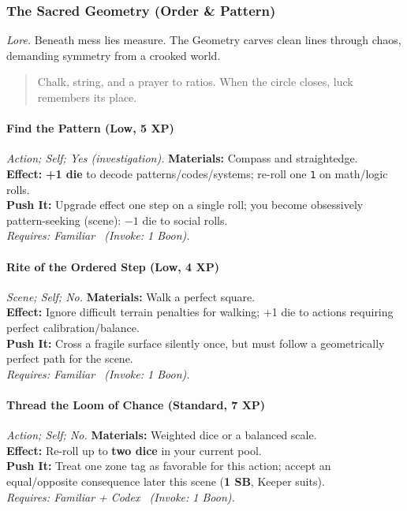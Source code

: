 \subsubsection{The Sacred Geometry (Order \& Pattern)}
\textit{Lore.} Beneath mess lies measure. The Geometry carves clean lines through chaos, demanding symmetry from a crooked world.

\begin{quote}
Chalk, string, and a prayer to ratios. When the circle closes, luck remembers its place.
\end{quote}

\paragraph{Find the Pattern (Low, 5 XP)} \emph{Action; Self; Yes (investigation).}
\textbf{Materials:} Compass and straightedge.\\
\textbf{Effect:} \textbf{+1 die} to decode patterns/codes/systems; re-roll one \texttt{1} on math/logic rolls.\\
\textbf{Push It:} Upgrade effect one step on a single roll; you become obsessively pattern-seeking (scene): \(-1\) die to social rolls.\\
\emph{Requires: Familiar \ (\textit{Invoke:} 1 Boon).}

\paragraph{Rite of the Ordered Step (Low, 4 XP)} \emph{Scene; Self; No.}
\textbf{Materials:} Walk a perfect square.\\
\textbf{Effect:} Ignore difficult terrain penalties for walking; +1 die to actions requiring perfect calibration/balance.\\
\textbf{Push It:} Cross a fragile surface silently once, but must follow a geometrically perfect path for the scene.\\
\emph{Requires: Familiar \ (\textit{Invoke:} 1 Boon).}

\paragraph{Thread the Loom of Chance (Standard, 7 XP)} \emph{Action; Self; No.}
\textbf{Materials:} Weighted dice or a balanced scale.\\
\textbf{Effect:} Re-roll up to \textbf{two dice} in your current pool.\\
\textbf{Push It:} Treat one zone tag as favorable for this action; accept an equal/opposite consequence later this scene (\textbf{1 SB}, Keeper suits).\\
\emph{Requires: Familiar + Codex \ (\textit{Invoke:} 1 Boon).}

